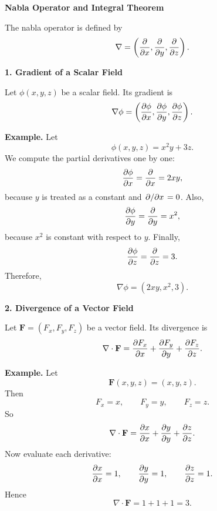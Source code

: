 \documentclass[a4paper,12pt]{letter}
\begin{document}
\begin{center}
\textbf{\huge Nabla Operator and Integral Theorem}
\end{center}


The nabla operator is defined by
$$
\nabla = \left( \pdv{}{x}, \pdv{}{y}, \pdv{}{z} \right).
$$

\textbf{1. Gradient of a Scalar Field}

Let $\phi(x,y,z)$ be a scalar field. Its gradient is
$$\nabla \phi =
\left(
\pdv{\phi}{x},
\pdv{\phi}{y},
\pdv{\phi}{z}
\right).$$

\textbf{Example.} Let
$$\phi(x,y,z)=x^2y+3z.$$
We compute the partial derivatives one by one:
$$\pdv{\phi}{x}=\pdv{}{x}(x^2y+3z)=2xy,$$
because $y$ is treated as a constant and $\pdv*{}{x}(3z)=0$.
Also,
$$\pdv{\phi}{y}=\pdv{}{y}(x^2y+3z)=x^2,$$
because $x^2$ is constant with respect to $y$.
Finally,
$$\pdv{\phi}{z}=\pdv{}{z}(x^2y+3z)=3.$$
Therefore,
$$\nabla \phi=(2xy,x^2,3).$$

\begin{center}
\end{center}

\textbf{2. Divergence of a Vector Field}

Let $\mathbf{F}=(F_x,F_y,F_z)$ be a vector field. Its divergence is
$$\nabla \cdot \mathbf{F}
=
\pdv{F_x}{x}
+
\pdv{F_y}{y}
+
\pdv{F_z}{z}.$$

\textbf{Example.} Let
$$\mathbf{F}(x,y,z)=(x,y,z).$$
Then
$$F_x=x,\qquad F_y=y,\qquad F_z=z.$$
So
$$\nabla\cdot\mathbf{F}
=
\pdv{x}{x}+\pdv{y}{y}+\pdv{z}{z}.$$
Now evaluate each derivative:
$$\pdv{x}{x}=1,\qquad \pdv{y}{y}=1,\qquad \pdv{z}{z}=1.$$
Hence
$$\nabla\cdot\mathbf{F}=1+1+1=3.$$

\begin{center}
\end{center}
\end{document}
